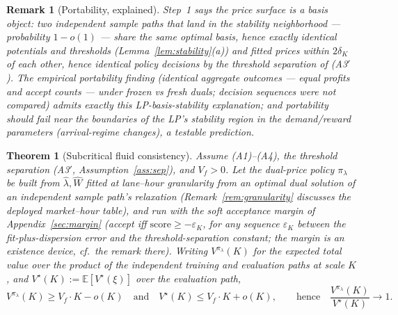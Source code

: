 \documentclass[11pt]{article}
\newtheorem{theorem}{Theorem}
\newtheorem{remark}{Remark}
\newcommand{\Vstar}{V^{\star}}
\newcommand{\pol}{\pi_{\lambda}}
\begin{document}
\begin{remark}[Portability, explained]
\label{rem:portability}
Step~1 says the price surface is a \emph{basis object}: two independent
sample paths that land in the stability neighborhood --- probability
$1 - o(1)$ --- share the same optimal basis, hence exactly identical
potentials and thresholds (Lemma~\ref{lem:stability}(a)) and fitted
prices within $2\delta_K$ of each other, hence identical policy
decisions by the threshold separation of (A3$'$). The empirical
portability finding (identical aggregate outcomes --- equal profits
and accept counts --- under frozen vs fresh duals; decision sequences
were not compared) admits exactly this LP-basis-stability
explanation; and
portability should fail near the boundaries of the LP's stability
region in the demand/reward parameters (arrival-regime changes), a
testable prediction.
\end{remark}

\begin{theorem}[Subcritical fluid consistency]
\label{thm:fluid}
Assume (A1)--(A4), the threshold separation (A3$'$,
Assumption~\ref{ass:sep}), and $V_f > 0$. Let the dual-price policy
$\pol$ be built from $\hat{\lambda}, \widehat{W}$ fitted \emph{at
lane--hour granularity} from an optimal dual solution of an
independent sample path's relaxation
(Remark~\ref{rem:granularity} discusses the deployed market--hour
table), and run with the soft acceptance margin of
Appendix~\ref{sec:margin} (accept iff
$\mathrm{score} \geq -\varepsilon_K$, for any sequence
$\varepsilon_K$ between the fit-plus-dispersion error and the
threshold-separation constant; the margin is an existence device, cf.\
the remark there). Writing $V^{\pol}(K)$ for the expected total value
over the product of the independent training and evaluation paths at
scale $K$, and $\Vstar(K) := \mathbb{E}[\Vstar(\xi)]$ over the
evaluation path,
\begin{equation}
  V^{\pol}(K) \geq V_f \cdot K - o(K)
  \quad\text{and}\quad
  \Vstar(K) \leq V_f \cdot K + o(K),
  \qquad\text{hence}\quad
  \frac{V^{\pol}(K)}{\Vstar(K)} \to 1.
\end{equation}
\end{theorem}
\end{document}
